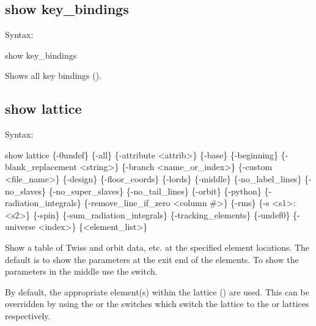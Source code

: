 {{{{{{{{%

\subsection{show key_bindings}
\label{s:show.key}

Syntax:
\begin{example}
  show key_bindings
\end{example}

Shows all key bindings ().


\subsection{show lattice}
\label{s:show.lattice}

Syntax:
\begin{example}
  show lattice \{-0undef\} \{-all\} \{-attribute <attrib>\} \{-base\} \{-beginning\}
      \{-blank_replacement <string>\}  \{-branch <name_or_index>\}
      \{-custom <file_name>\} \{-design\} \{-floor_coords\} \{-lords\} \{-middle\}
      \{-no_label_lines\} \{-no_slaves\} \{-no_super_slaves\} \{-no_tail_lines\} \{-orbit\} 
      \{-python\} \{-radiation_integrals\} \{-remove_line_if_zero <column \#>\} 
      \{-rms\} \{-s <s1>:<s2>\} \{-spin\} \{-sum_radiation_integrals\} \{-tracking_elements\} 
      \{-undef0\} \{-universe <index>\} \{<element_list>\} 
\end{example}

Show a table of Twiss and orbit data, etc. at the specified element locations. The default is to
show the parameters at the exit end of the elements. To show the parameters in the middle use the
 switch.

By default, the appropriate element(s) within the  lattice () are
used. This can be overridden by using the  or the  switches which switch the
lattice to the  or  lattices respectively.

}}}}}}}}
